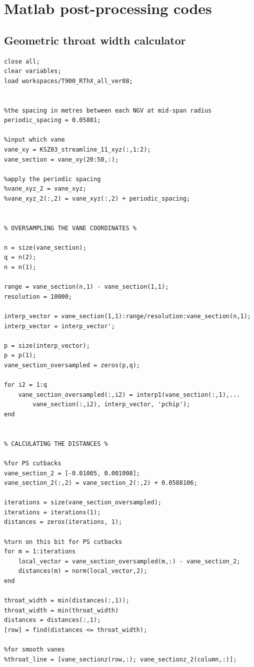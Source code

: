 \documentclass[a4paper, 11pt, oneside]{report}
\begin{document}
\appendix



\chapter{Matlab post-processing codes}

\section{Geometric throat width calculator}
\begin{verbatim}
close all;
clear variables;
load workspaces/T900_RThX_all_ver08;


%the spacing in metres between each NGV at mid-span radius
periodic_spacing = 0.05881; 

%input which vane
vane_xy = KSZ03_streamline_11_xyz(:,1:2);
vane_section = vane_xy(20:50,:);

%apply the periodic spacing
%vane_xyz_2 = vane_xyz;
%vane_xyz_2(:,2) = vane_xyz(:,2) + periodic_spacing;


% OVERSAMPLING THE VANE COORDINATES %

n = size(vane_section);
q = n(2);
n = n(1);

range = vane_section(n,1) - vane_section(1,1);
resolution = 10000;
    
interp_vector = vane_section(1,1):range/resolution:vane_section(n,1);
interp_vector = interp_vector';

p = size(interp_vector);
p = p(1);
vane_section_oversampled = zeros(p,q);

for i2 = 1:q
    vane_section_oversampled(:,i2) = interp1(vane_section(:,1),...
        vane_section(:,i2), interp_vector, 'pchip');
end 


% CALCULATING THE DISTANCES %

%for PS cutbacks
vane_section_2 = [-0.01005, 0.001008];
vane_section_2(:,2) = vane_section_2(:,2) + 0.0588106;

iterations = size(vane_section_oversampled);
iterations = iterations(1);
distances = zeros(iterations, 1);

%turn on this bit for PS cutbacks
for m = 1:iterations
    local_vector = vane_section_oversampled(m,:) - vane_section_2;
    distances(m) = norm(local_vector,2);
end

throat_width = min(distances(:,1));
throat_width = min(throat_width)
distances = distances(:,1);
[row] = find(distances <= throat_width);

%for smooth vanes
%throat_line = [vane_sectionz(row,:); vane_sectionz_2(column,:)];


\end{verbatim}
\end{document}
